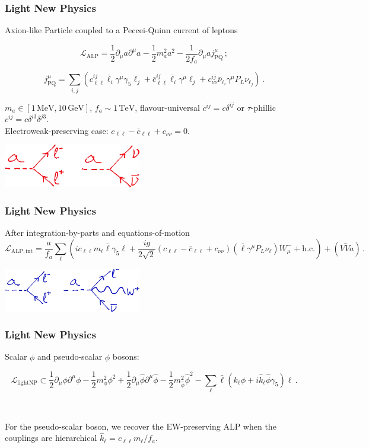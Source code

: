 \documentclass[mathserif, 10pt, aspectratio=169]{beamer}
\begin{document}
\begin{frame}\frametitle{Light New Physics}
    Axion-like Particle coupled to a Peccei-Quinn current of leptons

    $$\mathcal{L}_\mathrm{ALP} = \frac{1}{2}\partial_\mu a \partial^\mu a - \frac{1}{2} m_a^2 a^2 - \frac{1}{2 f_a}\partial_\mu a j^\mu_\mathrm{PQ}\,;$$

    $$j^\mu_\mathrm{PQ} = \sum_{i,j} \left( c_{\ell\ell}^{ij} \bar{\ell}_i\gamma^\mu \gamma_5 \ell_j + \bar{c}_{\ell\ell}^{ij} \bar{\ell}_i\gamma^\mu  \ell_j  + c_{\nu\nu}^{ij} \bar{\nu}_{\ell_i} \gamma^\mu P_L \nu_{\ell_j} \right)\,. $$

    $m_a \in [1\,\mathrm{MeV}, 10\,\mathrm{GeV}]$, $f_a \sim 1\,\mathrm{TeV}$, flavour-universal $c^{ij} = c \delta^{ij}$ or $\tau$-phillic $c^{ij} = c \delta^{i3}\delta^{j3}$.\\


    Electroweak-preserving case: $c_{\ell\ell} - \bar{c}_{\ell\ell} + c_{\nu\nu}=0$.
    \begin{center}
        \includegraphics[width=0.45\textwidth]{figures/rules_derbasis.png}
    \end{center}
\end{frame}

\begin{frame}\frametitle{Light New Physics}
    After integration-by-parts and equations-of-motion
    $$\mathcal{L}_\mathrm{ALP, int} = \frac{a}{f_a}\sum_\ell \left(i c_{\ell\ell}m_\ell \bar{\ell}\gamma_5\ell  + \frac{ig}{2 \sqrt{2}} (c_{\ell\ell} - \bar{c}_{\ell\ell} + c_{\nu\nu}) (\bar{\ell}\gamma^\mu P_L \nu_\ell) W^-_\mu + \mathrm{h.c.} \right) + (V\tilde{V}a)\,.$$
    \vspace{10pt}
    \begin{center}
        \includegraphics[width=0.45\textwidth]{figures/rules_Yukbasis.png}
    \end{center}
\end{frame}

\begin{frame}\frametitle{Light New Physics}

    Scalar $\phi$ and pseudo-scalar $\hat{\phi}$ bosons:

    $$\mathcal{L}_\mathrm{light NP} \subset \frac{1}{2}\partial_\mu \phi \partial^\mu \phi - \frac{1}{2} m_\phi^2 \phi^2 + \frac{1}{2}\partial_\mu \hat{\phi} \partial^\mu \hat{\phi} - \frac{1}{2} m_{\hat{\phi}}^2 \hat{\phi}^2 - \sum_\ell \bar{\ell}(k_\ell \phi + i \hat{k}_\ell \hat{\phi}\gamma_5) \ell\,.$$

    ~
    
    For the pseudo-scalar boson, we recover the EW-preserving ALP when the couplings are hierarchical $\hat{k}_\ell = c_{\ell\ell} m_\ell/f_a$.
\end{frame}
\end{document}
